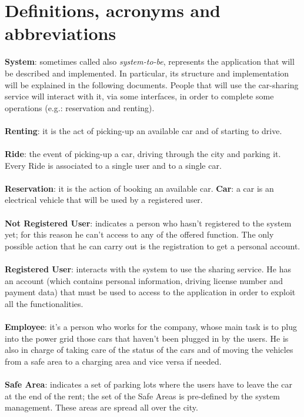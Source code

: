 \documentclass[11pt,a4paper]{report}
\begin{document}
\section{Definitions, acronyms and abbreviations}
\textbf{System}: sometimes called also \textit{system-to-be}, represents the application that will be described and implemented.
In particular, its structure and implementation will be explained in the following documents. People that will use the car-sharing service will interact with it, via some interfaces, in order to complete some operations (e.g.: reservation and renting).\\
\noindent \\
\textbf{Renting}: it is the act of picking-up an available car and of starting to drive.\\
\noindent \\
\textbf{Ride}: the event of picking-up a car, driving through the city and parking it. Every Ride is associated to a single user and to a single car.\\
\noindent \\
\textbf{Reservation}: it is the action of booking an available car. 
\textbf{Car}: a car is an electrical vehicle that will be used by a registered user. \\
\noindent \\
\textbf{Not Registered User}: indicates a person who hasn't registered to the system yet; for this reason he can't access to any of the offered function. The only possible action that he can carry out is the registration to get a personal account.\\ 
\indent \\
\textbf{Registered User}: interacts with the system to use the sharing service. He has an account (which contains personal information, driving license number and payment data) that must be used to access to the application in order to exploit all the functionalities. \\
\noindent \\
\textbf{Employee}: it's a person who works for the company, whose main task is to plug into the power grid those cars that haven't been plugged in by the users. He is also in charge of taking care of the status of the cars and of moving the vehicles from a safe area to a charging area and vice versa if needed.\\
\noindent \\
\textbf{Safe Area}: indicates a set of parking lots where the users have to leave the car at the end of the rent; the set of the Safe Areas is pre-defined by the system management. These areas are spread all over the city.\\
\end{document}
